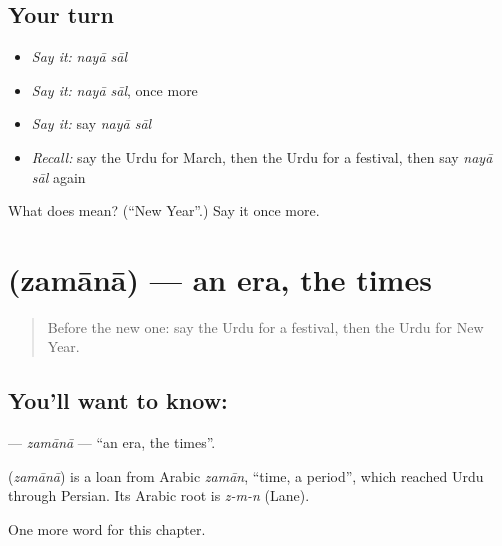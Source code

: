 \subsection*{Your turn}
\begin{itemize}
\raggedright
  \item \emph{Say it:} \emph{nayā sāl}
  \item \emph{Say it:} \emph{nayā sāl}, once more
  \item \emph{Say it:} say \emph{nayā sāl}
  \item \emph{Recall:} say the Urdu for March, then the Urdu for a festival, then say \emph{nayā sāl} again
\end{itemize}

\begin{tcolorbox}[breakable,colback=teal!4,colframe=teal!35!black,title={Before you move on}]
What does   mean? (\textquotedblleft{}New Year\textquotedblright{}.) Say it once more.
\end{tcolorbox}
\section[\texorpdfstring{\ur{زمانہ} (zamānā)}{زمانہ (zamānā)}]{ (zamānā) — an era, the times}

\label{lesson:UR-C156-zamana}



\begin{quote}
Before the new one: say the Urdu for a festival, then the Urdu for New Year.
\end{quote}

\subsection*{You'll want to know: }
\textbf{} — \emph{zamānā} — \textquotedblleft{}an era, the times\textquotedblright{}.

\begin{cousinweb}
\textbf{} (\emph{zamānā}) is a loan from Arabic \emph{zamān}, \textquotedblleft{}time, a period\textquotedblright{}, which reached Urdu through Persian. Its Arabic root is \emph{z-m-n} (Lane).
\end{cousinweb}

\begin{grammarlens}[title={What you've built}]
One more word for this chapter.
\end{grammarlens}

